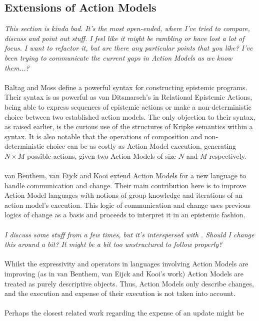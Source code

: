 \documentclass[12pt, a4paper, twoside]{article}
\begin{document}
\subsection{Extensions of Action Models}
{\em This section is kinda bad.
It's the most open-ended, where I've tried to compare, discuss and point out
	stuff.
I feel like it might be rambling or have lost a lot of focus.
I want to refactor it, but are there any particular points that you like?
I've been trying to communicate the current gaps in Action Models as we know
them...?}\\
\\
Baltag and Moss define a powerful syntax for constructing epistemic programs.
Their syntax is as powerful as van Ditsmarsch's in Relational Epistemic Actions,
being able to express sequences of epistemic actions or make a non-deterministic
choice between two established action models.
The only objection to their syntax, as raised earlier, is the curious use of
the structures of Kripke semantics within a syntax.
It is also notable that the operations of composition and non-deterministic
choice can be as costly as Action Model execution, generating $N \times M$
possible actions, given two Action Models of size $N$ and $M$
respectively.\citep{baltag2005programs}\\
\\
van Benthem, van Eijck and Kooi extend Action Models for a new language to
handle communication and change.
Their main contribution here is to improve Action Model languages with notions
of group knowledge and iterations of an action model's execution.
This logic of communication and change uses previous logics of change as a basis
and proceeds to interpret it in an epistemic fashion.\citep{benthem2006lcc}\\
\\
{\em I discuss some stuff from \citep{benthem2006lcc} a few times, but it's
	interspersed with \citep{bollig07mps}.
Should I change this around a bit?
It might be a bit too unstructured to follow properly?}\\
\\
Whilst the expressivity and operators in languages involving Action Models are
improving (as in van Benthem, van Eijck and Kooi's work) Action Models are
treated as purely descriptive objects.
Thus, Action Models only describe changes, and the execution and expense of
their execution is not taken into account.\\
\\
Perhaps the closest related work regarding the expense of an update might be
\end{document}
